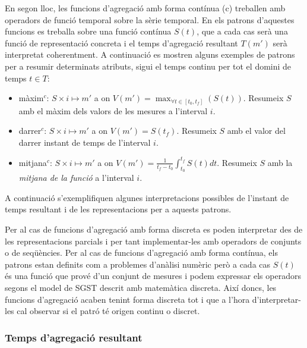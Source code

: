 En segon lloc, les funcions d'agregació amb forma contínua (c)
treballen amb operadors de funció temporal sobre la sèrie temporal.
En els patrons d'aquestes funcions es treballa sobre una funció
contínua $S(t)$, que a cada cas serà una funció de representació
concreta i el temps d'agregació resultant $T(m')$ serà interpretat
coherentment.  A continuació es mostren alguns exemples de patrons per
a resumir determinats atributs, sigui el temps continu per tot el
domini de temps $t\in T$:
\begin{itemize}
\item màxim$^c$: $S \times i \mapsto m'$ a on $V(m') = \max_{\forall t
    \in [t_0,t_f]}(S(t))$. Resumeix $S$ amb el màxim dels valors de
  les mesures a l'interval $i$.
\item darrer$^c$: $S \times i \mapsto m'$ a on $V(m') =
  S(t_f)$. Resumeix $S$ amb el valor del darrer instant de temps de
  l'interval $i$.

\item mitjana$^c$: $S \times i \mapsto m'$ a on $V(m') =
  \frac{1}{t_f-t_0} \int_{t_0}^{t_f} S(t)dt$. Resumeix $S$ amb la
  \emph{mitjana de la funció} \parencite{weisstein:averagefunction} a
  l'interval $i$.  

\end{itemize}


A continuació s'exemplifiquen algunes interpretacions possibles de
l'instant de temps resultant i de les representacions per a aquests
patrons. 

Per al cas de funcions d'agregació amb forma discreta es poden
interpretar des de les representacions parcials i per tant
implementar-les amb operadors de conjunts o de seqüències.  
Per al cas de funcions d'agregació amb forma contínua, els patrons
estan definits com a problemes d'anàlisi numèric però a cada cas
$S(t)$ és una funció que prové d'un conjunt de mesures i podem
expressar els operadors segons el model de SGST descrit amb matemàtica
discreta. Així doncs, les funcions d'agregació acaben tenint forma
discreta tot i que a l'hora d'interpretar-les cal observar si el patró
té origen continu o discret.




\subsubsection{Temps d'agregació resultant}

